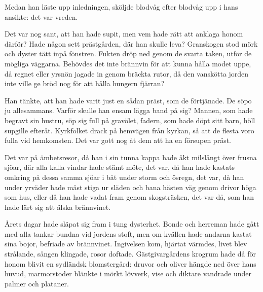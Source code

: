 Medan han läste upp inledningen, sköljde blodvåg efter blodvåg upp i hans ansikte: det var vreden.

Det var nog sant, att han hade supit, men vem hade rätt att anklaga honom därför? Hade någon sett prästgården, där han skulle leva? Granskogen stod mörk och dyster tätt inpå fönstren. Fukten dröp ned genom de svarta taken, utför de mögliga väggarna. Behövdes det inte brännvin för att kunna hålla modet uppe, då regnet eller yrsnön jagade in genom bräckta rutor, då den vanskötta jorden inte ville ge bröd nog för att hålla hungern fjärran?

Han tänkte, att han hade varit just en sådan präst, som de förtjänade. De söpo ju allesammans. Varför skulle han ensam lägga band på sig? Mannen, som hade begravt sin hustru, söp sig full på gravölet, fadern, som hade döpt sitt barn, höll supgille efteråt. Kyrkfolket drack på hemvägen från kyrkan, så att de flesta voro fulla vid hemkomsten. Det var gott nog åt dem att ha en försupen präst.

Det var på ämbetsresor, då han i sin tunna kappa hade åkt milslångt över frusna sjöar, där alla kalla vindar hade stämt möte, det var, då han hade kastats omkring på dessa samma sjöar i båt under storm och ösregn, det var, då han under yrväder hade måst stiga ur släden och bana hästen väg genom drivor höga som hus, eller då han hade vadat fram genom skogsträsken, det var då, som han hade lärt sig att älska brännvinet.

Årets dagar hade släpat sig fram i tung dysterhet. Bonde och herreman hade gått med alla tankar bundna vid jordens stoft, men om kvällen hade andarna kastat sina bojor, befriade av brännvinet. Ingivelsen kom, hjärtat värmdes, livet blev strålande, sången klingade, rosor doftade. Gästgivargårdens krogrum hade då för honom blivit en sydländsk blomstergård: druvor och oliver hängde ned över hans huvud, marmorstoder blänkte i mörkt lövverk, vise och diktare vandrade under palmer och plataner. 